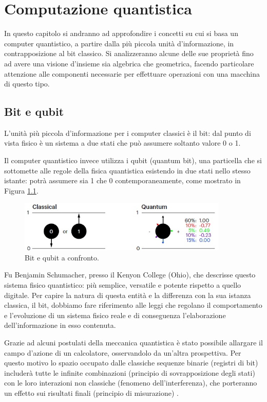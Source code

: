 \chapter{Computazione quantistica}
In questo capitolo si andranno ad approfondire i concetti su cui si basa un computer quantistico, a partire dalla più piccola unità d'informazione, in contrapposizione al bit classico. Si analizzeranno alcune delle sue proprietà fino ad avere una visione d'insieme sia algebrica che geometrica, facendo particolare attenzione alle componenti necessarie per effettuare operazioni con una macchina di questo tipo.

\section{Bit e qubit}
L'unità più piccola d'informazione per i computer classici è il bit: dal punto di vista fisico è un sistema a due stati che può assumere soltanto valore 0 o 1.

Il computer quantistico invece utilizza i qubit \cite{dipierro2013articolo, cambridge2010book} (quantum bit), una particella che si sottomette alle regole della fisica quantistica esistendo in due stati nello stesso istante: potrà assumere sia 1 che 0 contemporaneamente, come mostrato in Figura \ref{fig:bit_qubit}.
\begin{figure}[htp]
    \centering
    \includegraphics[width=10cm]{Images/Capitolo2/bit_qubit.png}
    \caption{Bit e qubit a confronto.}
    \label{fig:bit_qubit}
\end{figure}

Fu Benjamin Schumacher, presso il Kenyon College (Ohio), che descrisse questo sistema fisico quantistico: più semplice, versatile e potente rispetto a quello digitale.
Per capire la natura di questa entità e la differenza con la sua istanza classica, il bit, dobbiamo fare riferimento alle leggi che regolano il comportamento e l'evoluzione di un sistema fisico reale e di conseguenza l'elaborazione dell'informazione in esso contenuta.

Grazie ad alcuni postulati della meccanica quantistica è stato possibile allargare il campo d'azione di un calcolatore, osservandolo da un'altra prospettiva.
Per questo motivo lo spazio occupato dalle classiche sequenze binarie (registri di bit) includerà tutte le infinite combinazioni (principio di sovrapposizione degli stati) con le loro interazioni non classiche (fenomeno dell'interferenza), che porteranno un effetto sui risultati finali (principio di misurazione) \cite{dipierro2013articolo}.

